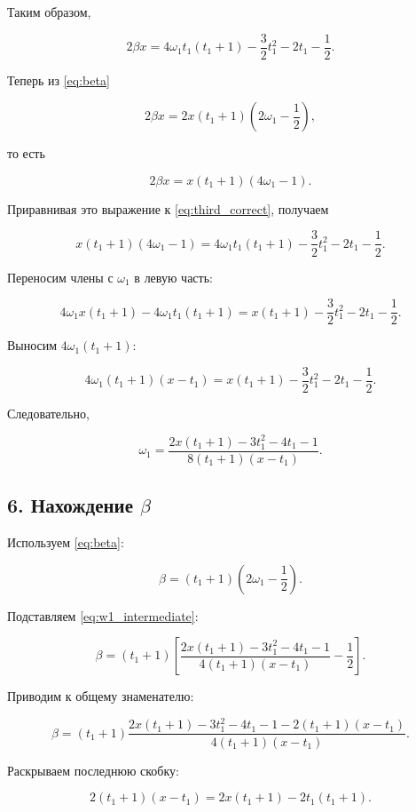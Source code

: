 \documentclass[a4paper,12pt]{article}
\begin{document}
	Таким образом,
	
	\begin{equation}
		\boxed{
			2\beta x
			=
			4\omega_1t_1(t_1+1)
			-\frac32t_1^2
			-2t_1
			-\frac12.
		}
		\label{eq:third_correct}
	\end{equation}
	
	Теперь из \eqref{eq:beta}
	
	\[
	2\beta x
	=
	2x(t_1+1)
	\left(
	2\omega_1-\frac12
	\right),
	\]
	
	то есть
	
	\[
	2\beta x
	=
	x(t_1+1)(4\omega_1-1).
	\]
	
	Приравнивая это выражение к \eqref{eq:third_correct}, получаем
	
	\[
	x(t_1+1)(4\omega_1-1)
	=
	4\omega_1t_1(t_1+1)
	-\frac32t_1^2
	-2t_1
	-\frac12.
	\]
	
	Переносим члены с $\omega_1$ в левую часть:
	
	\[
	4\omega_1x(t_1+1)
	-
	4\omega_1t_1(t_1+1)
	=
	x(t_1+1)
	-\frac32t_1^2
	-2t_1
	-\frac12.
	\]
	
	Выносим $4\omega_1(t_1+1)$:
	
	\[
	4\omega_1(t_1+1)(x-t_1)
	=
	x(t_1+1)
	-\frac32t_1^2
	-2t_1
	-\frac12.
	\]
	
	Следовательно,
	
	\begin{equation}
		\boxed{
			\omega_1
			=
			\frac{
				2x(t_1+1)-3t_1^2-4t_1-1
			}{
				8(t_1+1)(x-t_1)
			}.
		}
		\label{eq:w1_intermediate}
	\end{equation}
	
	\subsection*{6. Нахождение $\beta$}
	
	Используем \eqref{eq:beta}:
	
	\[
	\beta
	=
	(t_1+1)
	\left(
	2\omega_1-\frac12
	\right).
	\]
	
	Подставляем \eqref{eq:w1_intermediate}:
	
	\[
	\beta
	=
	(t_1+1)
	\left[
	\frac{
		2x(t_1+1)-3t_1^2-4t_1-1
	}{
		4(t_1+1)(x-t_1)
	}
	-\frac12
	\right].
	\]
	
	Приводим к общему знаменателю:
	
	\[
	\beta
	=
	(t_1+1)
	\frac{
		2x(t_1+1)-3t_1^2-4t_1-1
		-2(t_1+1)(x-t_1)
	}{
		4(t_1+1)(x-t_1)
	}.
	\]
	
	Раскрываем последнюю скобку:
	
	\[
	2(t_1+1)(x-t_1)
	=
	2x(t_1+1)-2t_1(t_1+1).
	\]
	
\end{document}
